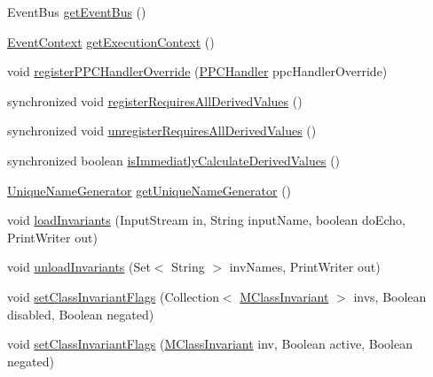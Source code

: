 \begin{DoxyCompactItemize}
Event\-Bus \hyperlink{classorg_1_1tzi_1_1use_1_1uml_1_1sys_1_1_m_system_af590bf4d5edfab590b2f5c5489def697}{get\-Event\-Bus} ()
\item 
\hyperlink{enumorg_1_1tzi_1_1use_1_1uml_1_1sys_1_1events_1_1tags_1_1_event_context}{Event\-Context} \hyperlink{classorg_1_1tzi_1_1use_1_1uml_1_1sys_1_1_m_system_a2399285bcc262fc288461ccade0dd0d3}{get\-Execution\-Context} ()
\item 
void \hyperlink{classorg_1_1tzi_1_1use_1_1uml_1_1sys_1_1_m_system_aae8e2dc4a2a80d54c66253b4d7cb75c9}{register\-P\-P\-C\-Handler\-Override} (\hyperlink{interfaceorg_1_1tzi_1_1use_1_1uml_1_1sys_1_1ppc_handling_1_1_p_p_c_handler}{P\-P\-C\-Handler} ppc\-Handler\-Override)
\item 
synchronized void \hyperlink{classorg_1_1tzi_1_1use_1_1uml_1_1sys_1_1_m_system_ad1ed74d395f2904afd1633605a88c0c9}{register\-Requires\-All\-Derived\-Values} ()
\item 
synchronized void \hyperlink{classorg_1_1tzi_1_1use_1_1uml_1_1sys_1_1_m_system_a219c0d88cf85f56355070375a9eb4553}{unregister\-Requires\-All\-Derived\-Values} ()
\item 
synchronized boolean \hyperlink{classorg_1_1tzi_1_1use_1_1uml_1_1sys_1_1_m_system_ac9ffec9632f9e8549825acd22b0bf2dc}{is\-Immediatly\-Calculate\-Derived\-Values} ()
\item 
\hyperlink{classorg_1_1tzi_1_1use_1_1util_1_1_unique_name_generator}{Unique\-Name\-Generator} \hyperlink{classorg_1_1tzi_1_1use_1_1uml_1_1sys_1_1_m_system_abf504d072e42e8a0a1c51229e5eb2b75}{get\-Unique\-Name\-Generator} ()
\item 
void \hyperlink{classorg_1_1tzi_1_1use_1_1uml_1_1sys_1_1_m_system_abaf2344a0b3d23fb86bd7b85f262c42b}{load\-Invariants} (Input\-Stream in, String input\-Name, boolean do\-Echo, Print\-Writer out)
\item 
void \hyperlink{classorg_1_1tzi_1_1use_1_1uml_1_1sys_1_1_m_system_a305175408548b7b5fea2675df87bec5c}{unload\-Invariants} (Set$<$ String $>$ inv\-Names, Print\-Writer out)
\item 
void \hyperlink{classorg_1_1tzi_1_1use_1_1uml_1_1sys_1_1_m_system_aaf3983c51daa310319e75c86c662ea90}{set\-Class\-Invariant\-Flags} (Collection$<$ \hyperlink{classorg_1_1tzi_1_1use_1_1uml_1_1mm_1_1_m_class_invariant}{M\-Class\-Invariant} $>$ invs, Boolean disabled, Boolean negated)
\item 
void \hyperlink{classorg_1_1tzi_1_1use_1_1uml_1_1sys_1_1_m_system_ae9258513f9476112bbf12ae4d4e844f1}{set\-Class\-Invariant\-Flags} (\hyperlink{classorg_1_1tzi_1_1use_1_1uml_1_1mm_1_1_m_class_invariant}{M\-Class\-Invariant} inv, Boolean active, Boolean negated)

\end{DoxyCompactItemize}
